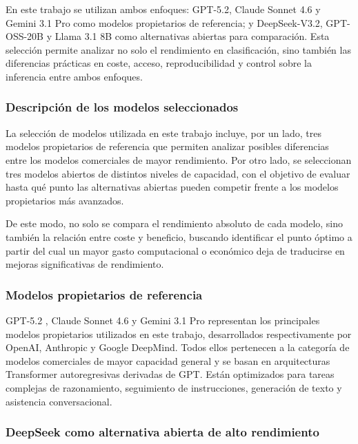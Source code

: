 En este trabajo se utilizan ambos enfoques: GPT-5.2, Claude Sonnet 4.6 y Gemini 3.1 Pro como modelos propietarios de referencia; y DeepSeek-V3.2, GPT-OSS-20B y Llama 3.1 8B como alternativas abiertas para comparación. Esta selección permite analizar no solo el rendimiento en clasificación, sino también las diferencias prácticas en coste, acceso, reproducibilidad y control sobre la inferencia entre ambos enfoques.

\subsubsection{Descripción de los modelos seleccionados}

La selección de modelos utilizada en este trabajo incluye, por un lado, tres modelos propietarios de referencia que permiten analizar posibles diferencias entre los modelos comerciales de mayor rendimiento. Por otro lado, se seleccionan tres modelos abiertos de distintos niveles de capacidad, con el objetivo de evaluar hasta qué punto las alternativas abiertas pueden competir frente a los modelos propietarios más avanzados.

De este modo, no solo se compara el rendimiento absoluto de cada modelo, sino también la relación entre coste y beneficio, buscando identificar el punto óptimo a partir del cual un mayor gasto computacional o económico deja de traducirse en mejoras significativas de rendimiento.

\subsubsection*{Modelos propietarios de referencia}

GPT-5.2 \cite{singh_openai_2025}, Claude Sonnet 4.6 \cite{noauthor_introducing_nodate} y Gemini 3.1 Pro \cite{noauthor_gemini_nodate} representan los principales modelos propietarios utilizados en este trabajo, desarrollados respectivamente por OpenAI, Anthropic y Google DeepMind. Todos ellos pertenecen a la categoría de modelos comerciales de mayor capacidad general y se basan en arquitecturas Transformer autoregresivas derivadas de \ac{GPT}. Están optimizados para tareas complejas de razonamiento, seguimiento de instrucciones, generación de texto y asistencia conversacional.

\subsubsection*{DeepSeek como alternativa abierta de alto rendimiento}

